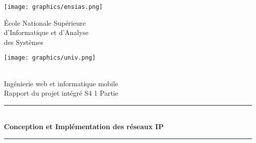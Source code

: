 \documentclass[12pt,a4paper]{report}
\makeatletter
\newcommand\frontmatter{%
	\cleardoublepage
	\pagenumbering{roman}}
\makeatother
\begin{document}
	\frontmatter
	\pagestyle{fancy}
	\fancyhf{}
	\fancyhf[HR]{\thepage}
	\fancyhf[HL]{\leftmark}
	\hyphenation{}
	
	
	\begin{titlepage}
		
		\begin{center}


		\begin{minipage}{0.5\textwidth}

		\begin{flushleft}
		\texttt{[image: graphics/ensias.png]}\\
		\begin{flushleft}
		 { \scriptsize  \'Ecole Nationale Supérieure \\[0.2cm]d’Informatique et d’Analyse\\ \hspace{10mm}des Systèmes  }

		\end{flushleft}

		 

		\end{flushleft}

		\end{minipage}
		\begin{minipage}{0.4\textwidth}
		\begin{flushright}
		\texttt{[image: graphics/univ.png]}\\
		\end{flushright}

		\end{minipage}\\[3cm]



		{\normalsize Ingénierie web et informatique mobile }\\[0.5cm]

		{\normalsize Rapport du projet intégré S4 1 Partie}\\[0.5cm]

		\rule{\linewidth}{0.5mm} \\[0.4cm]
		{ \large \bfseries Conception et Implémentation des réseaux IP\\[0.4cm] }
		\rule{\linewidth}{0.5mm} \\[3cm]


\end{center}
\end{titlepage}
\end{document}
